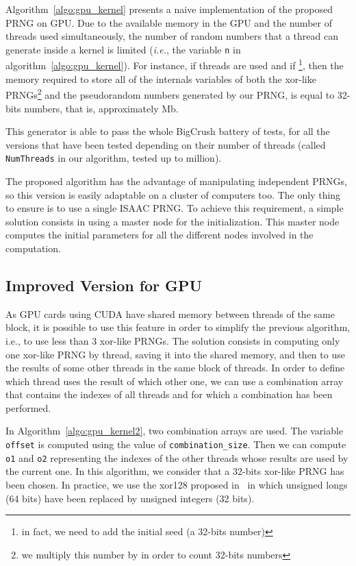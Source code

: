 \documentclass{article}
\begin{document}
Algorithm~\ref{algo:gpu_kernel}  presents a naive  implementation of the proposed  PRNG on
GPU.  Due to the available  memory in the  GPU and the number  of threads
used simultaneously,  the number  of random numbers  that a thread  can generate
inside   a    kernel   is   limited  (\emph{i.e.},    the    variable   \texttt{n}   in
algorithm~\ref{algo:gpu_kernel}). For instance, if   threads are used and
if \footnote{in fact, we need to add the initial seed (a 32-bits number)},
then   the  memory   required   to  store all of the  internals   variables  of both the  xor-like
PRNGs\footnote{we multiply this number by  in order to count 32-bits numbers}
and  the pseudorandom  numbers generated by  our  PRNG,  is  equal to   32-bits numbers, that is, approximately Mb.

This generator is able to pass the whole BigCrush battery of tests, for all
the versions that have been tested depending on their number of threads 
(called \texttt{NumThreads} in our algorithm, tested up to  million).

\begin{remark}
The proposed algorithm has  the  advantage of  manipulating  independent
PRNGs, so this version is easily adaptable on a cluster of computers too. The only thing
to ensure is to use a single ISAAC PRNG. To achieve this requirement, a simple solution consists in
using a master node for the initialization. This master node computes the initial parameters
for all the different nodes involved in the computation.
\end{remark}

\subsection{Improved Version for GPU}

As GPU cards using CUDA have shared memory between threads of the same block, it
is possible  to use this  feature in order  to simplify the  previous algorithm,
i.e., to use less  than 3 xor-like PRNGs. The solution  consists in computing only
one xor-like PRNG by thread, saving  it into the shared memory, and then to use the results
of some  other threads in the  same block of  threads. In order to  define which
thread uses the result of which other  one, we can use a combination array that
contains  the indexes  of  all threads  and  for which  a combination has  been
performed. 

In  Algorithm~\ref{algo:gpu_kernel2},  two  combination  arrays are  used.   The
variable     \texttt{offset}    is     computed    using     the     value    of
\texttt{combination\_size}.   Then we  can compute  \texttt{o1}  and \texttt{o2}
representing the  indexes of  the other  threads whose results  are used  by the
current one.   In this algorithm, we  consider that a 32-bits  xor-like PRNG has
been chosen. In practice, we  use the xor128 proposed in~\cite{Marsaglia2003} in
which  unsigned longs  (64 bits)  have been  replaced by  unsigned  integers (32
bits).
\end{document}

